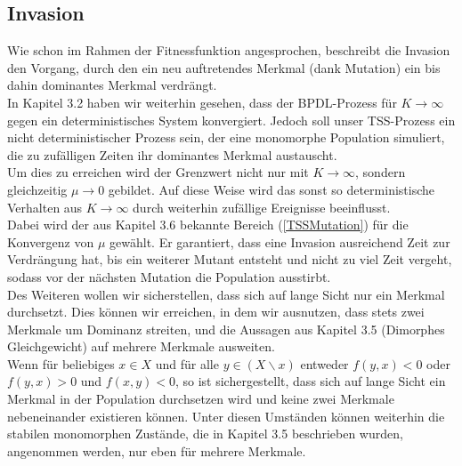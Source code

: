 \documentclass[11pt, a4paper, german]{article}
\theoremstyle{plain}
\begin{document}
	\subsection{Invasion}
	Wie schon im Rahmen der Fitnessfunktion angesprochen, beschreibt die Invasion den Vorgang, durch den ein neu auftretendes Merkmal (dank Mutation) ein bis dahin dominantes Merkmal verdrängt.\\
	In Kapitel 3.2 haben wir weiterhin gesehen, dass der BPDL-Prozess für $ K \to \infty $ gegen ein deterministisches System konvergiert. Jedoch soll unser TSS-Prozess ein nicht deterministischer Prozess sein, der eine monomorphe Population simuliert, die zu zufälligen Zeiten ihr dominantes Merkmal austauscht.\\
	Um dies zu erreichen wird der Grenzwert nicht nur mit $ K \to \infty $, sondern gleichzeitig $ \mu \to 0 $ gebildet. Auf diese Weise wird das sonst so deterministische Verhalten aus $ K \to \infty $ durch weiterhin zufällige Ereignisse beeinflusst.\\
	Dabei wird der aus Kapitel 3.6 bekannte Bereich (\ref{TSSMutation}) für die Konvergenz von $ \mu $ gewählt. Er garantiert, dass eine Invasion ausreichend Zeit zur Verdrängung hat, bis ein weiterer Mutant entsteht und nicht zu viel Zeit vergeht, sodass vor der nächsten Mutation die Population ausstirbt.\\
	Des Weiteren wollen wir sicherstellen, dass sich auf lange Sicht nur ein Merkmal durchsetzt. Dies können wir erreichen, in dem wir ausnutzen, dass stets zwei Merkmale um Dominanz streiten, und die Aussagen aus Kapitel 3.5 (Dimorphes Gleichgewicht) auf mehrere Merkmale ausweiten.\\
	Wenn für beliebiges $ x \in X $ und für alle $ y \in (X\backslash x) $ entweder $ f(y,x) < 0 $ oder $ f(y,x) > 0 $ und $ f(x,y) < 0 $, so ist sichergestellt, dass sich auf lange Sicht ein Merkmal in der Population durchsetzen wird und keine zwei Merkmale nebeneinander existieren können. Unter diesen Umständen können weiterhin die stabilen monomorphen Zustände, die in Kapitel 3.5 beschrieben wurden, angenommen werden, nur eben für mehrere Merkmale.\\
	
\end{document}
